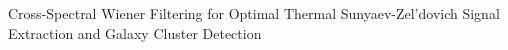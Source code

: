 \documentclass[]{article}
\begin{document}
Cross-Spectral Wiener Filtering for Optimal Thermal Sunyaev-Zel'dovich Signal Extraction and Galaxy Cluster Detection
\end{document}
